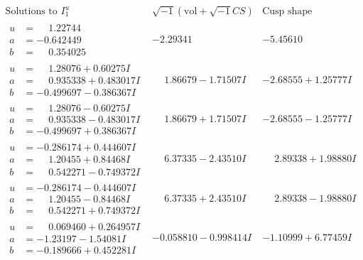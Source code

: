\documentclass[1p]{elsarticle_modified}
\theoremstyle{definition}
\newcommand{\I}{\sqrt{-1}}
\begin{document}
$$\begin{array}{c|c|c}  
\text{Solutions to }I^u_{1}& \I (\text{vol} + \sqrt{-1}CS) & \text{Cusp shape}\\
 \hline 
\begin{aligned}
u &= \phantom{-}1.22744\phantom{ +0.000000I} \\
a &= -0.642449\phantom{ +0.000000I} \\
b &= \phantom{-}0.354025\phantom{ +0.000000I}\end{aligned}
 & -2.29341\phantom{ +0.000000I} & -5.45610\phantom{ +0.000000I} \\ \hline\begin{aligned}
u &= \phantom{-}1.28076 + 0.60275 I \\
a &= \phantom{-}0.935338 + 0.483017 I \\
b &= -0.499697 - 0.386367 I\end{aligned}
 & \phantom{-}1.86679 - 1.71507 I & -2.68555 + 1.25777 I \\ \hline\begin{aligned}
u &= \phantom{-}1.28076 - 0.60275 I \\
a &= \phantom{-}0.935338 - 0.483017 I \\
b &= -0.499697 + 0.386367 I\end{aligned}
 & \phantom{-}1.86679 + 1.71507 I & -2.68555 - 1.25777 I \\ \hline\begin{aligned}
u &= -0.286174 + 0.444607 I \\
a &= \phantom{-}1.20455 + 0.84468 I \\
b &= \phantom{-}0.542271 - 0.749372 I\end{aligned}
 & \phantom{-}6.37335 - 2.43510 I & \phantom{-}2.89338 + 1.98880 I \\ \hline\begin{aligned}
u &= -0.286174 - 0.444607 I \\
a &= \phantom{-}1.20455 - 0.84468 I \\
b &= \phantom{-}0.542271 + 0.749372 I\end{aligned}
 & \phantom{-}6.37335 + 2.43510 I & \phantom{-}2.89338 - 1.98880 I \\ \hline\begin{aligned}
u &= \phantom{-}0.069460 + 0.264957 I \\
a &= -1.23197 - 1.54081 I \\
b &= -0.189666 + 0.452281 I\end{aligned}
 & -0.058810 - 0.998414 I & -1.10999 + 6.77459 I \\ \hline\begin{aligned}

\end{aligned}
\end{array}$$
\end{document}
